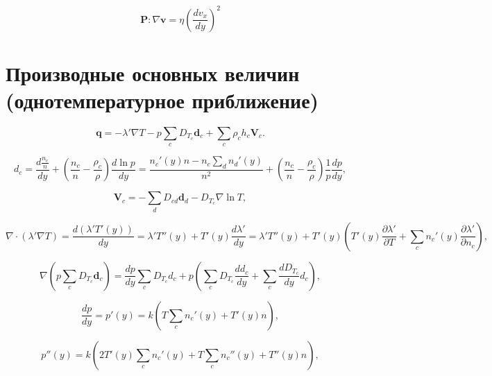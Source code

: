 \documentclass[12pt]{article}
\begin{document}
\begin{equation}
  \mathbf{P} : \nabla \mathbf{v} = \eta \left(\frac{d v_{x}}{d y} \right)^2
\end{equation}

\section{Производные основных величин (однотемпературное приближение)}

\begin{equation}
  \mathbf{q} = -\lambda' \nabla T - p \sum_{c} D_{T_{c}} \mathbf{d}_{c} + \sum_{c} \rho_{c} h_{c} \mathbf{V}_{c}.
\end{equation}

\begin{equation}
  d_{c} = \frac{d \frac{n_{c}}{n}}{d y} + \left(\frac{n_{c}}{n} - \frac{\rho_{c}}{\rho} \right) \frac{d \ln p}{d y} =
  \frac{n_{c}'(y)n - n_{c}\sum_{d}n_{d}'(y)}{n^2} + \left(\frac{n_{c}}{n} - \frac{\rho_{c}}{\rho} \right)\frac{1}{p} \frac{d p}{d y},
\end{equation}

\begin{equation}
  \mathbf{V}_{c} = -\sum_{d}D_{cd}\mathbf{d}_{d} - D_{T_{c}}\nabla \ln T,
\end{equation}

\begin{equation}
  \nabla \cdot (\lambda' \nabla T) = \frac{d (\lambda' T'(y))}{dy} = \lambda' T''(y) + T'(y) \frac{d \lambda'}{d y} = \lambda' T''(y) + T'(y) \left(T'(y) \frac{\partial \lambda'}{\partial T} + \sum_{c} n_{c}'(y) \frac{\partial \lambda'}{\partial n_{c}} \right),\label{d-lambda-nabla-T}
\end{equation}

\begin{equation}
  \nabla \left(p \sum_{c} D_{T_{c}} \mathbf{d}_{c} \right) = \frac{d p}{d y} \sum_{c} D_{T_{c}} d_{c} + p \left(\sum_{c} D_{T_{c}} \frac{d d_{c}}{d y} + \sum_{c} \frac{d D_{T_{c}}}{d y} d_{c} \right),
\end{equation}

\begin{equation}
  \frac{d p}{d y} = p'(y) = k \left(T\sum_{c} n_{c}'(y) +  T'(y)n \right),
\end{equation}

\begin{equation}
  p''(y) = k \left(2T'(y)\sum_{c} n_{c}'(y) + T\sum_{c} n_{c}''(y) +  T''(y)n\right),
\end{equation}
\end{document}
